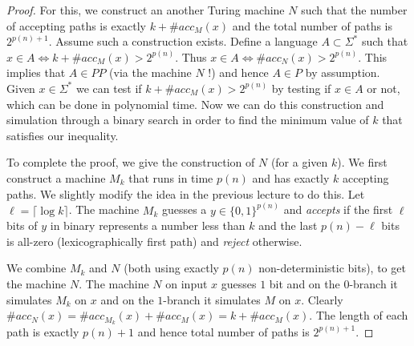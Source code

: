 \begin{proof}
For this, we construct an another Turing machine $N$ such that the number of accepting paths is exactly $k+\#acc_M(x)$ and the total number of paths is $2^{p(n)+1}$. Assume such a construction exists. Define a language $A \subset \Sigma^*$ such that $x \in A \iff k+\#acc_M(x) > 2^{p(n)}$. Thus $x \in A \iff \#acc_N(x) > 2^{p(n)}$. This implies that $A \in PP$ (via the machine $N$ !) and hence $A \in P$ by assumption. Given $x \in \Sigma^*$ we can test if $k+\#acc_M(x) > 2^{p(n)}$ by testing if $x \in A$ or not, which can be done in polynomial time. Now we can do this construction and simulation through a binary search in order to find the minimum value of $k$ that satisfies our inequality.

To complete the proof, we give the construction of $N$ (for a given $k$). 
We first construct a machine $M_k$ that runs in time $p(n)$ and has exactly $k$ accepting paths. 
We slightly modify the idea in the previous lecture to do this. Let $\ell = \lceil \log k \rceil$.
The machine $M_k$ guesses a $y \in \{0,1\}^{p(n)}$ and {\em accepts} if the first $\ell$ bits of $y$ in binary represents a number less than $k$ and the last $p(n)-\ell$  bits is all-zero (lexicographically first path) and {\em reject} otherwise.

We combine $M_k$ and $N$ (both using exactly $p(n)$ non-deterministic bits), to get the machine $N$. The machine $N$ on input $x$ guesses $1$ bit and on the $0$-branch it simulates $M_k$ on $x$ and on the $1$-branch it simulates $M$ on $x$. Clearly $\#acc_N(x) = \#acc_{M_k}(x) + \#acc_{M}(x) = k+\#acc_{M}(x)$. The length of each path is exactly $p(n)+1$ and hence total number of paths is $2^{p(n)+1}$.
\end{proof}



